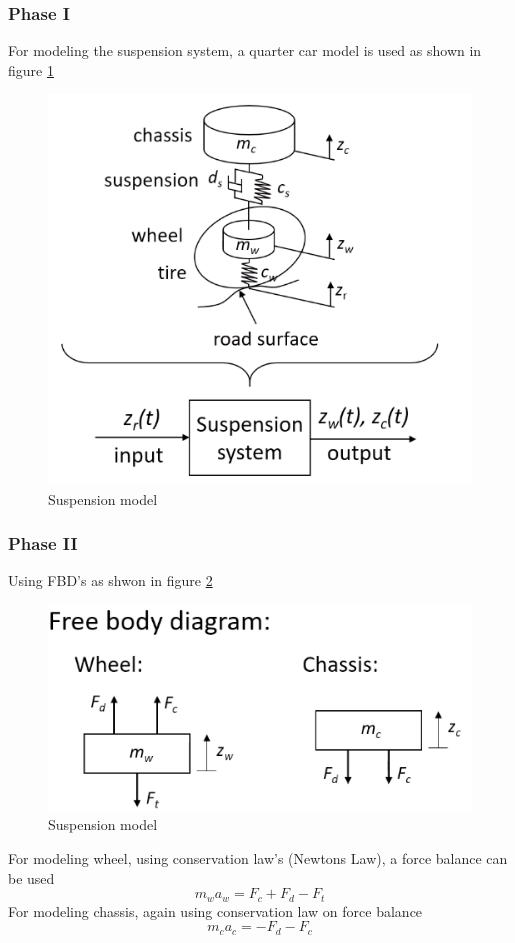\subsubsection{Phase I}
For modeling the suspension system, a quarter car model is used as shown in figure \ref{Fig_ModelAutoSys_SuspensionModel}
\begin{figure}[h!]
	\centering
	\includegraphics[width=0.6\linewidth]{Bilder/ModelAutoSys_SuspensionModel}
	\caption{Suspension model}
	\label{Fig_ModelAutoSys_SuspensionModel}
\end{figure}
\newpage

\subsubsection{Phase II}

Using FBD's as shwon in figure \ref{Fig_ModelAutoSys_SuspensionModel_FBD}
\begin{figure}[h!]
	\centering
	\includegraphics[width=0.75\linewidth]{Bilder/ModelAutoSys_SuspensionModel_FBD}
	\caption{Suspension model}
	\label{Fig_ModelAutoSys_SuspensionModel_FBD}
\end{figure}

For modeling wheel, using conservation law's (Newtons Law), a force balance can be used
\begin{equation}
	m_w a_w = F_c + F_d - F_t 
\end{equation}
For modeling chassis, again using conservation law on force balance
\begin{equation}
	m_c a_c = -F_d - F_c
\end{equation}

